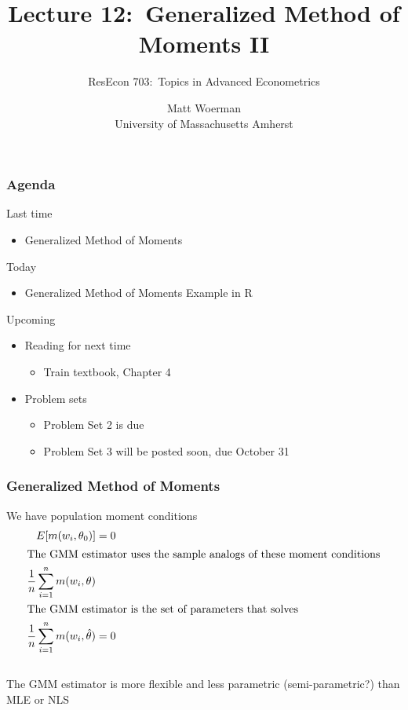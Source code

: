 \documentclass{beamer}\usepackage[]{graphicx}\usepackage[]{color}
\title[Lecture 12:\ Generalized Method of Moments II]{Lecture 12:\ Generalized Method of Moments II}
\author[ResEcon 703:\ Advanced Econometrics]{ResEcon 703:\ Topics in Advanced Econometrics}
\date{Matt Woerman\\University of Massachusetts Amherst}
\begin{document}
{ 
\begin{frame}[noframenumbering]
    \titlepage
\end{frame}
}

\begin{frame}\frametitle{Agenda}
    Last time
    \begin{itemize}
        \item Generalized Method of Moments
    \end{itemize}
    \vspace{2ex}
    Today
    \begin{itemize}
        \item Generalized Method of Moments Example in R
    \end{itemize}
    \vspace{2ex}
    Upcoming
    \begin{itemize}
        \item Reading for next time
        \begin{itemize}
            \item Train textbook, Chapter 4
        \end{itemize}
        \item Problem sets
        \begin{itemize}
            \item Problem Set 2 is due
            \item Problem Set 3 will be posted soon, due October 31
        \end{itemize}
    \end{itemize}
\end{frame}

\begin{frame}\frametitle{Generalized Method of Moments}
    We have population moment conditions
    \begin{align*}
        E[m(w_i, \theta_0)] &= 0 \\
        \intertext{The GMM estimator uses the sample analogs of these moment conditions}
        \frac{1}{n} \sum_{i = 1}^n m(w_i, \theta) & \\
        \intertext{The GMM estimator is the set of parameters that solves}
        \frac{1}{n} \sum_{i = 1}^n m(w_i, \hat{\theta}) &= 0
    \end{align*} \\
    \vspace{2ex}
    The GMM estimator is more flexible and less parametric (semi-parametric?) than MLE or NLS
\end{frame}
\end{document}
